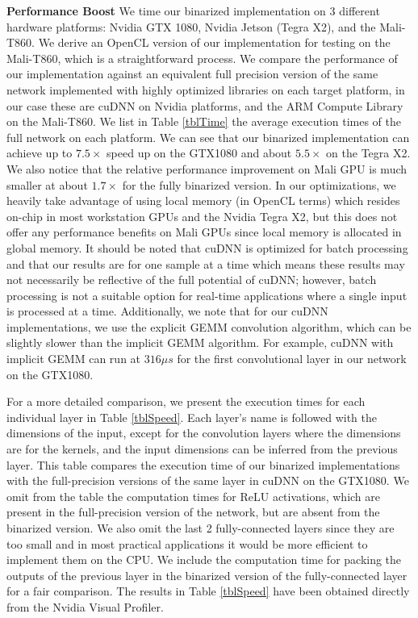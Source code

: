 \documentclass[conference,compsoc]{IEEEtran}
\newcommand{\prosaic}[1]{#1}
\begin{document}
\textbf{Performance Boost}
We time our binarized implementation on 3 different hardware platforms: Nvidia GTX 1080, Nvidia Jetson (Tegra X2), and the Mali-T860. We derive an OpenCL version of our implementation for testing on the Mali-T860, which is a straightforward process. We compare the performance of our implementation against an equivalent full precision version of the same network implemented with highly optimized libraries on each target platform, in our case these are cuDNN on Nvidia platforms, and the ARM Compute Library on the Mali-T860. 
We list in Table \ref{tblTime} the average execution times of the full network on each platform. \prosaic{We can see that} our binarized implementation can achieve up to $7.5\times $ speed up on the GTX1080 and about $5.5\times $ on the Tegra X2. \prosaic{We also notice that} the relative performance improvement on Mali GPU is much smaller at about $1.7\times $ for the fully binarized version. In our optimizations, we heavily take advantage of using local memory (in OpenCL terms) which resides on-chip in most workstation GPUs and the Nvidia Tegra X2, but this does not offer any performance benefits on Mali GPUs since local memory is allocated in global memory.
It should be noted that cuDNN is optimized for batch processing and that our results are for one sample at a time which means these results may not necessarily be reflective of the full potential of cuDNN; however, batch processing is not a suitable option for real-time applications where a single input is processed at a time. Additionally, we note that for our cuDNN implementations, we use the explicit GEMM convolution algorithm, which can be slightly slower than the implicit GEMM algorithm. For example, cuDNN with implicit GEMM can run at $316 \mu s$ for the first convolutional layer in our network on the GTX1080.%

For a more detailed comparison, we present the execution times for each individual layer in Table \ref{tblSpeed}. Each layer's name is followed with the dimensions of the input, except for the convolution layers where the dimensions are for the kernels, and the input dimensions can be inferred from the previous layer. This table compares the execution time of our binarized implementations with the full-precision versions of the same layer in cuDNN on the GTX1080. We omit from the table the computation times for ReLU activations, which are present in the full-precision version of the network, but are absent from the binarized version. We also omit the last 2 fully-connected layers since they are too small and in most practical applications it would be more efficient to implement them on the CPU. We include the computation time for packing the outputs of the previous layer in the binarized version of the fully-connected layer for a fair comparison. The results in Table \ref{tblSpeed} have been obtained directly from the Nvidia Visual Profiler. %
\end{document}

